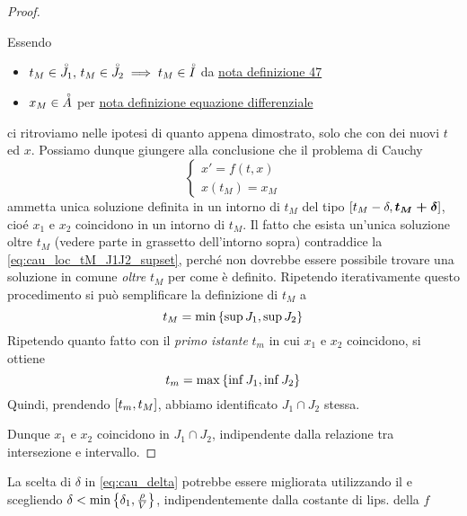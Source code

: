 \begin{theorem}
\begin{proof}
\begin{itemize}
				Essendo
				\begin{itemize}
					\item $t_M \in \accentset{\circ}{J_1},\,t_M \in \accentset{\circ}{J_2} \implies t_M \in \accentset{\circ}{I}$ da \hyperlink{note:diff_eq_sol_definit_set}{nota definizione 47}
					\item $x_M \in \accentset{\circ}{A}$ per \hyperlink{def:equaz_diff_sol}{nota definizione equazione differenziale}
				\end{itemize}
				ci ritroviamo nelle ipotesi di quanto appena dimostrato, solo che con dei nuovi $t$ ed $x$. Possiamo dunque giungere alla conclusione che il problema di Cauchy
				$$\begin{cases}x'=f(t,x)\\x(t_M)=x_M\end{cases}$$
				ammetta unica soluzione definita in un intorno di $t_M$ del tipo $\left[t_M-\delta,\boldsymbol{t_M+\delta}\right]$, cioé $x_1$ e $x_2$ coincidono in un intorno di $t_M$. Il fatto che esista un'unica soluzione oltre $t_M$ (vedere parte in grassetto dell'intorno sopra) contraddice la \cref{eq:cau_loc_tM_J1J2_supset}, perché non dovrebbe essere possibile trovare una soluzione in comune \textit{oltre} $t_M$ per come è definito. Ripetendo iterativamente questo procedimento si può semplificare la definizione di $t_M$ a
				$$t_M = \min \left\{\sup J_1, \sup J_2\right\}$$
				Ripetendo quanto fatto con il \textit{primo istante} $t_m$ in cui $x_1$ e $x_2$ coincidono, si ottiene
				$$t_m = \max \left\{\inf J_1, \inf J_2\right\}$$
				Quindi, prendendo $\left[t_m,t_M\right]$, abbiamo identificato $J_1 \cap J_2$ stessa.
		\end{itemize}
		Dunque $x_1$ e $x_2$ coincidono in $J_1 \cap J_2$, indipendente dalla relazione tra intersezione e intervallo.
	\end{proof}
	\begin{note}
		La scelta di $\delta$ in \cref{eq:cau_delta} potrebbe essere migliorata utilizzando il  e scegliendo $\delta<\min\left\{\delta_1,\frac{\rho}{V}\right\}$, indipendentemente dalla costante di lips. della $f$
	\end{note}
\end{theorem}

